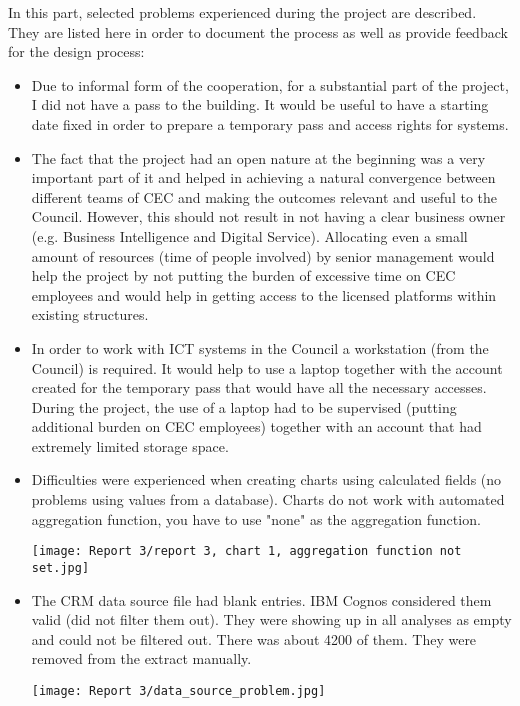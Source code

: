 In this part, selected problems experienced during the project are described. They are listed here in order to document the process as well as provide feedback for the design process:
\begin{itemize}
\item Due to informal form of the cooperation, for a substantial part of the project, I did not have a pass to the building. It would be useful to have a starting date fixed in order to prepare a temporary pass and access rights for systems.
\item The fact that the project had an open nature at the beginning was a very important part of it and helped in achieving a natural convergence between different teams of CEC and making the outcomes relevant and useful to the Council. However, this should not result in not having a clear business owner (e.g. Business Intelligence and Digital Service). Allocating even a small amount of resources (time of people involved) by senior management would help the project by not putting the burden of excessive time on CEC employees and would help in getting access to the licensed platforms within existing structures.
\item In order to work with ICT systems in the Council a workstation (from the Council) is required. It would help to use a laptop together with the account created for the temporary pass that would have all the necessary accesses. During the project, the use of a laptop had to be supervised (putting additional burden on CEC employees) together with an account that had extremely limited storage space.
\item Difficulties were experienced when creating charts using calculated fields (no problems using values from a database). Charts do not work with automated aggregation function, you have to use "none" as the aggregation function.
\begin{center}
  \texttt{[image: Report 3/report 3, chart 1, aggregation function not set.jpg]}
\end{center}
\item The CRM data source file had blank entries. IBM Cognos considered them valid (did not filter them out). They were showing up in all analyses as empty and could not be filtered out. There was about 4200 of them. They were removed from the extract manually.
\begin{center}
  \texttt{[image: Report 3/data\_source\_problem.jpg]}

\end{center}
\end{itemize}
